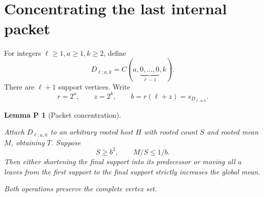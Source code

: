 \documentclass[11pt,letterpaper]{article}
\theoremstyle{plain}
\newtheorem*{packetlemma}{Lemma P}
\begin{document}
\section{Concentrating the last internal packet}\label{concentrating-the-last-internal-packet}

For integers \(\ell\ge1,a\ge1,k\ge2\), define \[
D_{\ell;a,k}=C(a,\underbrace{0,\ldots,0}_{\ell-1},k).
\] There are \(\ell+1\) support vertices. Write \[
r=2^a,\qquad z=2^k,\qquad b=r(\ell+z)=s_{D_{\ell;a,k}}.
\]

\begin{packetlemma}[Packet concentration]\label{lem:packet}

Attach \(D_{\ell;a,k}\) to an arbitrary rooted host \(H\) with rooted count \(S\) and rooted mean \(M\), obtaining \(T\). Suppose \[
S\ge b^2,\qquad M/S\le1/b.
\tag{3.1}\label{eq:main-3-1}
\] Then either shortening the final support into its predecessor or moving all \(a\) leaves from the first support to the final support strictly increases the global mean.

Both operations preserve the complete vertex set.

\end{packetlemma}
\end{document}
